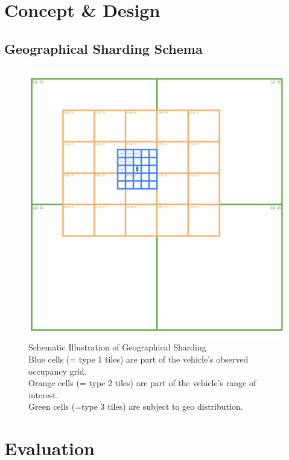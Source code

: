 \section{Concept \& Design}
\label{sec:appendix:texts:concept_design}

\subsection{Geographical Sharding Schema}
\label{subsec:appendix:texts:concept_design:geographical_partitioning_schema}
\begin{figure}[H]
	\centering
	\includegraphics[width=0.9\linewidth]{98_images/geo_subscription_schema}
	\caption[Schematic Illustration of Geographical Sharding]{Schematic Illustration of Geographical Sharding \\ Blue cells (= type 1 tiles) are part of the vehicle's observed occupancy grid. \\ Orange cells (= type 2 tiles) are part of the vehicle's range of interest. \\ Green cells (=type 3 tiles) are subject to geo distribution.}
	\label{fig:geo_distribution_schema}
\end{figure}

\section{Evaluation}
\label{sec:appendix:texts:evaluation}


